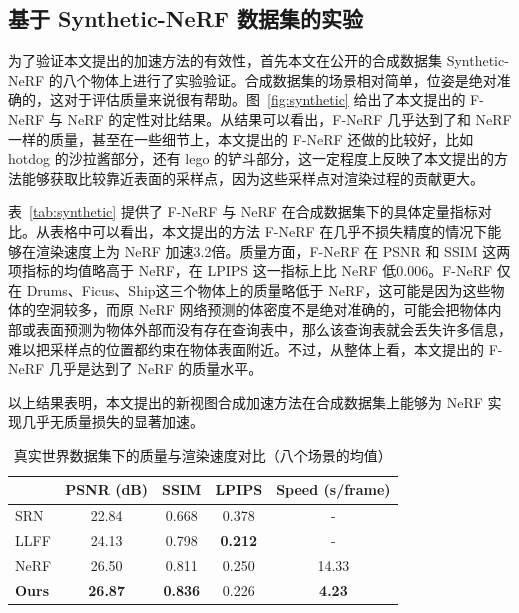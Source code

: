 \subsection{基于 Synthetic-NeRF 数据集的实验}
为了验证本文提出的加速方法的有效性，首先本文在公开的合成数据集 Synthetic-NeRF 的八个物体上进行了实验验证。合成数据集的场景相对简单，位姿是绝对准确的，这对于评估质量来说很有帮助。图~\ref{fig:synthetic} 给出了本文提出的 F-NeRF 与 NeRF 的定性对比结果。从结果可以看出，F-NeRF 几乎达到了和 NeRF 一样的质量，甚至在一些细节上，本文提出的 F-NeRF 还做的比较好，比如 hotdog 的沙拉酱部分，还有 lego 的铲斗部分，这一定程度上反映了本文提出的方法能够获取比较靠近表面的采样点，因为这些采样点对渲染过程的贡献更大。

表~\ref{tab:synthetic} 提供了 F-NeRF 与 NeRF 在合成数据集下的具体定量指标对比。从表格中可以看出，本文提出的方法 F-NeRF 在几乎不损失精度的情况下能够在渲染速度上为 NeRF 加速3.2倍。质量方面，F-NeRF 在 PSNR 和 SSIM 这两项指标的均值略高于 NeRF，在 LPIPS 这一指标上比 NeRF 低0.006。F-NeRF 仅在 Drums、Ficus、Ship这三个物体上的质量略低于 NeRF，这可能是因为这些物体的空洞较多，而原 NeRF 网络预测的体密度不是绝对准确的，可能会把物体内部或表面预测为物体外部而没有存在查询表中，那么该查询表就会丢失许多信息，难以把采样点的位置都约束在物体表面附近。不过，从整体上看，本文提出的 F-NeRF 几乎是达到了 NeRF 的质量水平。

以上结果表明，本文提出的新视图合成加速方法在合成数据集上能够为 NeRF 实现几乎无质量损失的显著加速。

\pagebreak
\begin{table}[htbp]
	\caption{真实世界数据集下的质量与渲染速度对比（八个场景的均值）}%
	\centering
	{\small{}\setlength\tabcolsep{12pt}
			
		\begin{tabular}{lcccc}
			\toprule
			&PSNR (dB) \uparrow & SSIM\uparrow & LPIPS\downarrow & Speed (s/frame) \downarrow\\
			\midrule
			SRN\cite{sitzmann2019scene}         & 22.84  & 0.668  & 0.378 & -\\
			LLFF\cite{mildenhall2019local}   		 & 24.13  & 0.798  & \textbf{0.212} & -\\
			NeRF\cite{mildenhall2020nerf}   		 & 26.50  & 0.811  & 0.250 & 14.33\\
			\textbf{Ours} & \textbf{26.87}  & \textbf{0.836}  & 0.226 &\textbf{4.23}\\
			\bottomrule
		\end{tabular}
	}
	\label{tab:real}
\end{table}

